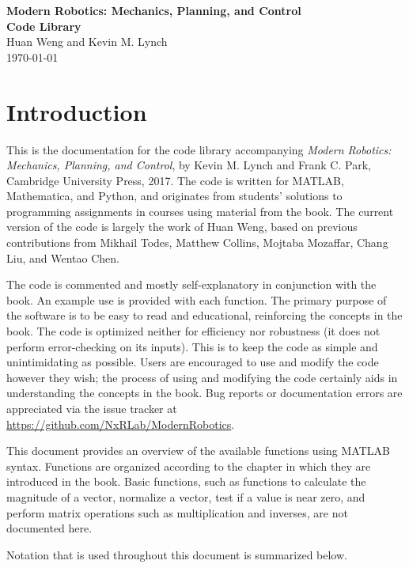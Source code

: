 \documentclass[11pt]{article}
\begin{document}
\begin{center}			%
\Large
{\bf Modern Robotics:  Mechanics, Planning, and Control} \\
{\bf Code Library} \\
\normalsize
\vspace*{0.2in}
Huan Weng and Kevin M. Lynch \\
\today
\end{center}

\section*{Introduction}			

This is the documentation for the code library accompanying \emph{Modern Robotics:  Mechanics, Planning, and Control}, by Kevin M. Lynch and Frank C. Park, Cambridge University Press, 2017.  The code is written for MATLAB, Mathematica, and Python, and originates from students' solutions to programming assignments in courses using material from the book.  The current version of the code is largely the work of Huan Weng, based on previous contributions from Mikhail Todes, Matthew Collins, Mojtaba Mozaffar, Chang Liu, and Wentao Chen.  

The code is commented and mostly self-explanatory in conjunction with the book.  An example use is provided with each function.  The primary purpose of the software is to be easy to read and educational, reinforcing the concepts in the book.  The code is optimized neither for efficiency nor robustness (it does not perform error-checking on its inputs).  This is to keep the code as simple and unintimidating as possible.  Users are encouraged to use and modify the code however they wish; the process of using and modifying the code certainly aids in understanding the concepts in the book.  Bug reports or documentation errors are appreciated via the issue tracker at \url{https://github.com/NxRLab/ModernRobotics}.

This document provides an overview of the available functions using MATLAB syntax.  Functions are organized according to the chapter in which they are introduced in the book.  Basic functions, such as functions to calculate the magnitude of a vector, normalize a vector, test if a value is near zero, and perform matrix operations such as multiplication and inverses, are not documented here.

Notation that is used throughout this document is summarized below.
\end{document}
